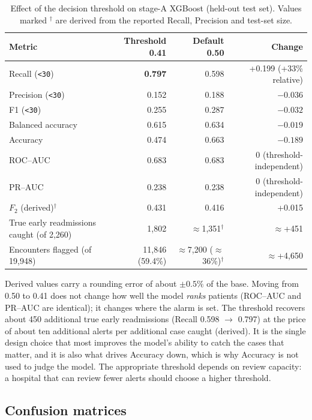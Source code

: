 \documentclass[10pt,a4paper]{article}
\begin{document}
\begin{table}[H]
\centering
\caption{Effect of the decision threshold on stage-A XGBoost (held-out test set). Values marked $^{\dagger}$ are derived from the reported Recall, Precision and test-set size.}
\label{tab:threshold}
\small
\begin{tabular}{p{5.6cm}rrr}
\toprule
Metric & Threshold 0.41 & Default 0.50 & Change\\
\midrule
Recall (\texttt{<30}) & \textbf{0.797} & 0.598 & +0.199 (+33\% relative)\\
Precision (\texttt{<30}) & 0.152 & 0.188 & $-0.036$\\
F1 (\texttt{<30}) & 0.255 & 0.287 & $-0.032$\\
Balanced accuracy & 0.615 & 0.634 & $-0.019$\\
Accuracy & 0.474 & 0.663 & $-0.189$\\
ROC--AUC & 0.683 & 0.683 & 0 (threshold-independent)\\
PR--AUC & 0.238 & 0.238 & 0 (threshold-independent)\\
$F_2$ (derived)$^{\dagger}$ & 0.431 & 0.416 & +0.015\\
True early readmissions caught (of 2,260) & 1,802 & $\approx$1,351$^{\dagger}$ & $\approx$+451\\
Encounters flagged (of 19,948) & 11,846 (59.4\%) & $\approx$7,200 ($\approx$36\%)$^{\dagger}$ & $\approx$+4,650\\
\bottomrule
\end{tabular}
\end{table}

Derived values carry a rounding error of about $\pm0.5\%$ of the base. Moving from 0.50 to 0.41 does not change how well the model \emph{ranks} patients (ROC--AUC and PR--AUC are identical); it changes where the alarm is set. The threshold recovers about 450 additional true early readmissions (Recall 0.598 $\rightarrow$ 0.797) at the price of about ten additional alerts per additional case caught (derived). It is the single design choice that most improves the model's ability to catch the cases that matter, and it is also what drives Accuracy down, which is why Accuracy is not used to judge the model. The appropriate threshold depends on review capacity: a hospital that can review fewer alerts should choose a higher threshold.

\subsection{Confusion matrices}
\end{document}
